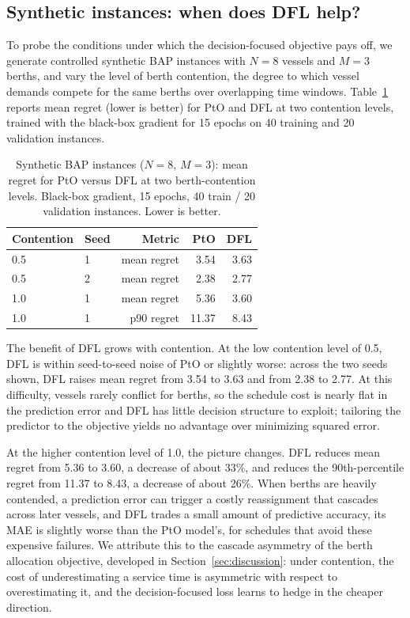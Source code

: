 \subsection{Synthetic instances: when does DFL help?}

To probe the conditions under which the decision-focused objective pays off, we generate controlled synthetic BAP instances with $N=8$ vessels and $M=3$ berths, and vary the level of berth contention, the degree to which vessel demands compete for the same berths over overlapping time windows. Table~\ref{tab:synthetic} reports mean regret (lower is better) for PtO and DFL at two contention levels, trained with the black-box gradient for 15 epochs on 40 training and 20 validation instances.

\begin{table}[t]
\centering
\caption{Synthetic BAP instances ($N=8$, $M=3$): mean regret for PtO versus DFL at two berth-contention levels. Black-box gradient, 15 epochs, 40 train / 20 validation instances. Lower is better.}
\label{tab:synthetic}
\begin{tabular}{llrrr}
\toprule
Contention & Seed & Metric & PtO & DFL \\
\midrule
0.5 & 1 & mean regret & 3.54 & 3.63 \\
0.5 & 2 & mean regret & 2.38 & 2.77 \\
\midrule
1.0 & 1 & mean regret & 5.36 & 3.60 \\
1.0 & 1 & p90 regret  & 11.37 & 8.43 \\
\bottomrule
\end{tabular}
\end{table}

The benefit of DFL grows with contention. At the low contention level of 0.5, DFL is within seed-to-seed noise of PtO or slightly worse: across the two seeds shown, DFL raises mean regret from 3.54 to 3.63 and from 2.38 to 2.77. At this difficulty, vessels rarely conflict for berths, so the schedule cost is nearly flat in the prediction error and DFL has little decision structure to exploit; tailoring the predictor to the objective yields no advantage over minimizing squared error.

At the higher contention level of 1.0, the picture changes. DFL reduces mean regret from 5.36 to 3.60, a decrease of about 33\%, and reduces the 90th-percentile regret from 11.37 to 8.43, a decrease of about 26\%. When berths are heavily contended, a prediction error can trigger a costly reassignment that cascades across later vessels, and DFL trades a small amount of predictive accuracy, its MAE is slightly worse than the PtO model's, for schedules that avoid these expensive failures. We attribute this to the cascade asymmetry of the berth allocation objective, developed in Section~\ref{sec:discussion}: under contention, the cost of underestimating a service time is asymmetric with respect to overestimating it, and the decision-focused loss learns to hedge in the cheaper direction.

